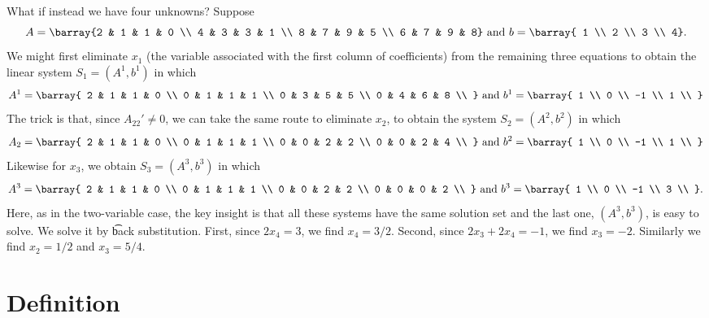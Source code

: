 What if instead we have four unknowns?
Suppose
\[
A = \barray{2 & 1 & 1 & 0 \\ 4 & 3 & 3 & 1 \\ 8 & 7 & 9 & 5 \\ 6 & 7 & 9 & 8} \text{ and } b = \barray{ 1 \\ 2 \\ 3 \\ 4}.
\]
We might first eliminate $x_1$ (the variable associated with the first column of coefficients) from the remaining three equations to obtain the linear system $S_1 = (A^1, b^1)$ in which
\[
A^1 = \barray{
2 & 1 & 1 & 0 \\
0 & 1 & 1 & 1 \\
0 & 3 & 5 & 5 \\
0 & 4 & 6 & 8 \\
} \text{ and } b^1 = \barray{
1 \\
0 \\
-1 \\
1 \\
}
\]
The trick is that, since $A_{22}' \neq 0$, we can take the same route to eliminate $x_2$, to obtain the system $S_2 = (A^2, b^2)$ in which
\[
A_2 = \barray{
2 & 1 & 1 & 0 \\
0 & 1 & 1 & 1 \\
0 & 0 & 2 & 2 \\
0 & 0 & 2 & 4 \\
} \text{ and } b^2 = \barray{
1 \\
0 \\
-1 \\
1 \\
}
\]
Likewise for $x_3$, we obtain $S_3 = (A^3, b^3)$ in which
\[
A^3 = \barray{
2 & 1 & 1 & 0 \\
0 & 1 & 1 & 1 \\
0 & 0 & 2 & 2 \\
0 & 0 & 0 & 2 \\
} \text{ and } b^3 = \barray{
1 \\
0 \\
-1 \\
3 \\
}.
\]
Here, as in the two-variable case, the key insight is that all these systems have the same solution set and the last one, $(A^3, b^3)$, is easy to solve.
We solve it by \t{back substitution}.
First, since $2x_4 = 3$, we find $x_4 = 3/2$.
Second, since $2x_3 + 2x_4 = -1$, we find $x_3 = -2$.
Similarly we find $x_2 = 1/2$ and $x_3 = 5/4$.

\section*{Definition}

